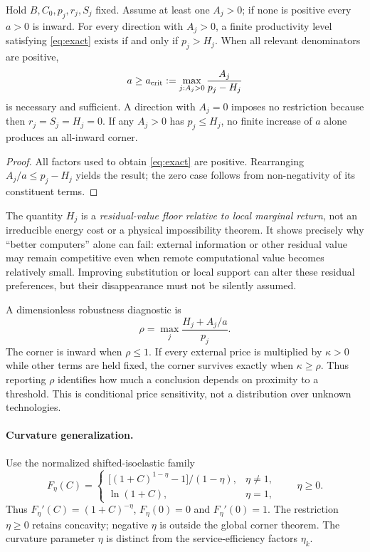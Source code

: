 \begin{proposition}
\label{prop:threshold}
Hold $B,C_0,p_j,r_j,S_j$ fixed. Assume at least one $A_j>0$; if none is positive every $a>0$ is inward. For every direction with $A_j>0$, a finite productivity level satisfying \cref{eq:exact} exists if and only if $p_j>H_j$. When all relevant denominators are positive,
\begin{equation}
 a\geq a_{\rm crit}:=\max_{j:A_j>0}\frac{A_j}{p_j-H_j}
 \label{eq:acrit}
\end{equation}
is necessary and sufficient. A direction with $A_j=0$ imposes no restriction because then $r_j=S_j=H_j=0$. If any $A_j>0$ has $p_j\leq H_j$, no finite increase of $a$ alone produces an all-inward corner.
\end{proposition}
\begin{proof}
All factors used to obtain \cref{eq:exact} are positive. Rearranging $A_j/a\leq p_j-H_j$ yields the result; the zero case follows from non-negativity of its constituent terms.
\end{proof}

The quantity $H_j$ is a \emph{residual-value floor relative to local marginal return}, not an irreducible energy cost or a physical impossibility theorem. It shows precisely why ``better computers'' alone can fail: external information or other residual value may remain competitive even when remote computational value becomes relatively small. Improving substitution or local support can alter these residual preferences, but their disappearance must not be silently assumed.

A dimensionless robustness diagnostic is
\begin{equation}
 \rho=\max_j\frac{H_j+A_j/a}{p_j}.
 \label{eq:rho}
\end{equation}
The corner is inward when $\rho\leq1$. If every external price is multiplied by $\kappa>0$ while other terms are held fixed, the corner survives exactly when $\kappa\geq\rho$. Thus reporting $\rho$ identifies how much a conclusion depends on proximity to a threshold. This is conditional price sensitivity, not a distribution over unknown technologies.

\paragraph{Curvature generalization.}

Use the normalized shifted-isoelastic family
\begin{equation}
 F_\eta(C)=
 \begin{cases}
 \big[(1+C)^{1-\eta}-1\big]/(1-\eta),&\eta\neq1,\\
 \ln(1+C),&\eta=1,
 \end{cases}
 \qquad \eta\geq0.
 \label{eq:isoelastic}
\end{equation}
Thus $F_\eta'(C)=(1+C)^{-\eta}$, $F_\eta(0)=0$ and
$F_\eta'(0)=1$. The restriction $\eta\geq0$ retains concavity;
negative $\eta$ is outside the global corner theorem. The curvature
parameter $\eta$ is distinct from the service-efficiency factors $\eta_k$.

